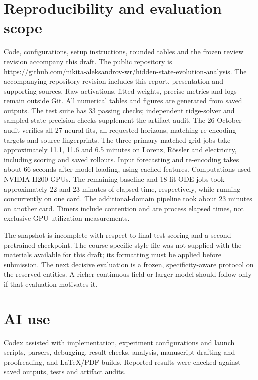 \documentclass[10pt,a4paper,twocolumn]{article}
\newcommand{\codeurl}{\url{https://github.com/nikita-aleksandrov-wr/hidden-state-evolution-analysis}}
\begin{document}
\section*{Reproducibility and evaluation scope}
Code, configurations, setup instructions, rounded tables and the frozen review revision accompany this draft.
The public repository is \codeurl.
The accompanying repository revision includes this report, presentation and supporting sources.
Raw activations, fitted weights, precise metrics and logs remain outside Git.
All numerical tables and figures are generated from saved outputs.
The test suite has 33 passing checks; independent ridge-solver and sampled state-precision checks supplement the artifact audit.
The 26 October audit verifies all 27 neural fits, all requested horizons, matching re-encoding targets and source fingerprints.
The three primary matched-grid jobs take approximately 11.1, 11.6 and 6.5 minutes on Lorenz, R\"ossler and electricity, including scoring and saved rollouts.
Input forecasting and re-encoding takes about 66 seconds after model loading, using cached features.
Computations used NVIDIA H200 GPUs.
The remaining-baseline and 18-fit ODE jobs took approximately 22 and 23 minutes of elapsed time, respectively, while running concurrently on one card.
The additional-domain pipeline took about 23 minutes on another card.
Timers include contention and are process elapsed times, not exclusive GPU-utilization measurements.

The snapshot is incomplete with respect to final test scoring and a second pretrained checkpoint.
The course-specific style file was not supplied with the materials available for this draft; its formatting must be applied before submission.
The next decisive evaluation is a frozen, specificity-aware protocol on the reserved entities.
A richer continuous field or larger model should follow only if that evaluation motivates it.

\section*{AI use}
Codex assisted with implementation, experiment configurations and launch scripts, parsers, debugging, result checks, analysis, manuscript drafting and proofreading, and LaTeX/PDF builds.
Reported results were checked against saved outputs, tests and artifact audits.
\end{document}
